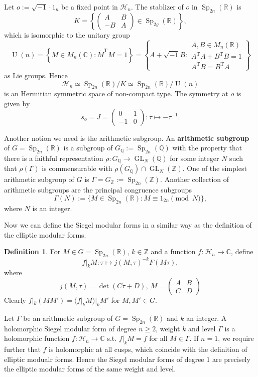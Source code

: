 \documentclass[11pt,english]{smfart}
\theoremstyle{definition}
\newtheorem{definition}{Definition}
\theoremstyle{remark}
\newcommand{\R}{\mathbb{R}}
\renewcommand{\C}{\mathbb{C}}
\newcommand{\Q}{\mathbb{Q}}
\newcommand{\Z}{\mathbb{Z}}
\newcommand{\iu}{\sqrt{-1}} %
\DeclareMathOperator{\GL}{GL}
\DeclareMathOperator{\Sp}{Sp}
\DeclareMathOperator{\Uni}{U}
\newcommand{\tran}[1]{{#1}^{\mathrm{T}}} %
\newcommand{\ctran}[1]{\bar{{#1}}^{\mathrm{T}}} %
\renewcommand{\bar}{\overline}
\begin{document}
Let $o := \iu\cdot 1_n$ be a fixed point in $\mathcal{H}_n$.
The stablizer of $o$ in $\Sp_{2n}(\R)$ is \[K = \left\{\begin{pmatrix}
    A & B \\ -B & A
\end{pmatrix}\in \Sp_{2g}(\R{})\right\},\]
which is isomorphic to the unitary group \[\Uni(n) = \left\{ M\in M_n(\C): \ctran{M}M = 1 \right\} = \left\{A+\iu B: \begin{matrix}
    A, B\in M_n(\R{})\\ \tran{A}A + \tran{B}B = 1\\ \tran{A}B = \tran{B}A
\end{matrix} \right\}\] as Lie groups.
Hence \[\mathcal{H}_n\simeq \Sp_{2n}(\R)/K\simeq \Sp_{2n}(\R)/\Uni(n)\] is an Hermitian symmetric space of non-compact type.
The symmetry at $o$ is given by \[s_o = J = \begin{pmatrix}
    0 & 1 \\ -1 & 0
\end{pmatrix}: \tau\mapsto -\tau^{-1}.\]

Another notion we need is the arithmetic subgroup.
An \textbf{arithmetic subgroup} of $G = \Sp_{2n}(\R)$ is a subgroup of $G_\Q := \Sp_{2n}(\Q)$ with the property that there is a faithful representation $\rho: G_\Q\to\GL_{N}(\Q)$ for some integer $N$ such that $\rho(\Gamma)$ is commensurable with $\rho(G_\Q)\cap \GL_N(\Z)$.
One of the simplest arithmetic subgroup of $G$ is $\Gamma = G_\Z := \Sp_{2n}(\Z)$.
Another collection of arithmetic subgroups are the principal congruence subgroups \[\Gamma(N) := \{M\in\Sp_{2n}(\R): M\equiv 1_{2n}\pmod N\},\]where $N$ is an integer.

Now we can define the Siegel modular forms in a similar way as the definition of the elliptic modular forms.
\begin{definition}
    For $M\in G = \Sp_{2n}(\R)$, $k\in \Z$ and a function $f:\mathcal{H}_n\to \C$, define \[f|_{k}M: \tau\mapsto j(M, \tau)^{-k} F(M\tau),\]
    where \[j(M, \tau) = \det(C\tau + D),\ M = \begin{pmatrix}
        A & B \\ C & D
    \end{pmatrix}\]
    Clearly $f|_k(MM') = (f|_kM)|_kM'$ for $M, M'\in G$.

    Let $\Gamma$ be an arithmetic subgroup of $G = \Sp_{2n}(\R)$ and $k$ an integer.
    A holomorphic Siegel modular form of degree $n\ge 2$, weight $k$ and level $\Gamma$ is a holomorphic function $f:\mathcal{H}_n\to\C$ s.t. $f|_kM = f$ for all $M\in\Gamma$.
    If $n=1$, we require further that $f$ is holomorphic at all cusps, which coincide with the definition of elliptic modualr forms. Hence the Siegel modular forms of degree $1$ are precisely the elliptic modular forms of the same weight and level.
\end{definition}
\end{document}
